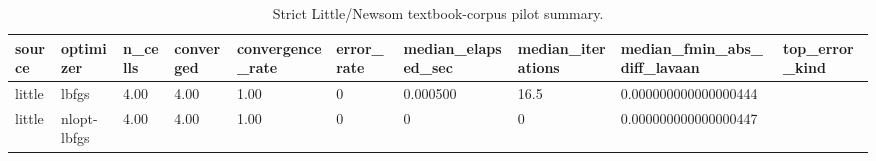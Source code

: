 \begin{table}[ht]
\centering
\caption{Strict Little/Newsom textbook-corpus pilot summary.}
\begin{tabular}{llllllllll}
\hline
source & optimizer & n\_cells & converged & convergence\_rate & error\_rate & median\_elapsed\_sec & median\_iterations & median\_fmin\_abs\_diff\_lavaan & top\_error\_kind
\\ \hline
little & lbfgs & 4.00 & 4.00 & 1.00 & 0 & 0.000500 & 16.5 & 0.000000000000000444 &  \\
little & nlopt-lbfgs & 4.00 & 4.00 & 1.00 & 0 & 0 & 0 & 0.000000000000000447 &  \\
\hline
\end{tabular}
\end{table}
